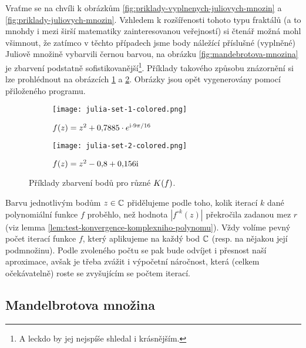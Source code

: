 Vraťme se na chvíli k obrázkům \ref{fig:priklady-vyplnenych-juliovych-mnozin} a \ref{fig:priklady-juliovych-mnozin}. Vzhledem k rozšířenosti tohoto typu fraktálů (a to mnohdy i mezi širší matematiky zainteresovanou veřejností) si čtenář možná mohl všimnout, že zatímco v těchto případech jsme body náležící příslušné (vyplněné) Juliově množině vybarvili černou barvou, na obrázku \ref{fig:mandebrotova-mnozina} je zbarvení podstatně sofistikovanější\footnote{A leckdo by jej nejspíše shledal i krásnějším.}. Příklady takového způsobu znázornění si lze prohlédnout na obrázcích \ref{subfig:vyplnena-juliova-mnozina-1-obarveno} a \ref{subfig:vyplnena-juliova-mnozina-2-obarveno}. Obrázky jsou opět vygenerovány pomocí přiloženého programu.
\begin{figure}[h]
    \centering
    \begin{subfigure}{0.48\textwidth}
        \centering
        \texttt{[image: julia-set-1-colored.png]}
        \caption{$f(z)=z^2 + 0{,}7885\cdot e^{\textrm{i}\cdot9\pi/16}$}
        \label{subfig:vyplnena-juliova-mnozina-1-obarveno}
    \end{subfigure}
    \quad
    \begin{subfigure}{0.48\textwidth}
        \centering
        \texttt{[image: julia-set-2-colored.png]}
        \caption{$f(z)=z^2 - 0{,}8 + 0{,}156\textrm{i}$}
        \label{subfig:vyplnena-juliova-mnozina-2-obarveno}
    \end{subfigure}
    \caption{Příklady zbarvení bodů pro různé $K(f)$.}
    \label{fig:priklady-vyplnenych-juliovych-mnozin-obarveno}
\end{figure}

Barvu jednotlivým bodům $z\in\mathbb{C}$ přidělujeme podle toho, kolik iterací $k$ dané polynomiální funkce $f$ proběhlo, než hodnota $|f^{\circ k}(z)|$ překročila zadanou mez $r$ (viz lemma \ref{lem:test-konvergence-komplexniho-polynomu}). Vždy volíme pevný počet iterací funkce $f$, který aplikujeme na každý bod $\mathbb{C}$ (resp. na nějakou její podmnožinu). Podle zvoleného počtu se pak bude odvíjet i přesnost naší aproximace, avšak je třeba zvážit i výpočetní náročnost, která (celkem očekávatelně) roste se zvyšujícím se počtem iterací.

\subsection{Mandelbrotova množina}\label{subsec:mandebrotova-mnozina}